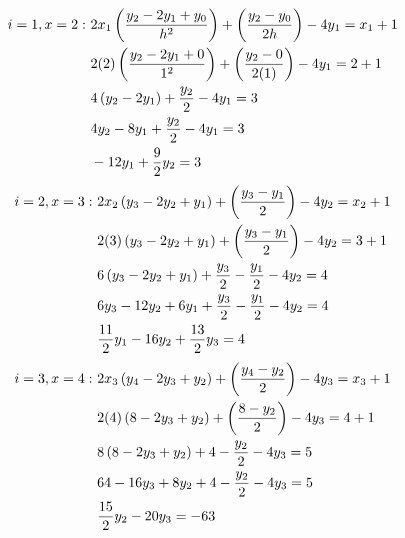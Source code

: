 	\begin{align}
		i=1,x=2: \ &
		2x_{1}
		\left(
			\frac{y_{2} - 2y_{1} + y_{0}}{h^{2}}
		\right)
		+
		\left(
			\frac{y_{2} - y_{0}}{2h}
		\right)
		- 4y_{1} = x_{1} + 1&
		\\ &
		2(2)
		\left(
			\frac{y_{2} - 2y_{1} + 0}{1^{2}}
		\right)
		+
		\left(
			\frac{y_{2} - 0}{2(1)}
		\right)
		- 4y_{1} = 2 + 1&
		\notag \\ &
		4
		\left(
			y_{2} - 2y_{1}
		\right)
		+
		\frac{y_{2}}{2} - 4y_{1} = 3&
		\notag \\ &
		4y_{2} - 8y_{1} + \frac{y_{2}}{2} - 4y_{1} = 3&
		\notag \\ &
		-12y_{1} + \frac{9}{2}y_{2} = 3&
		\\
	\end{align}
	\begin{align}
		i=2,x=3: \ &
		2x_{2}
		\left(
			y_{3} - 2y_{2} + y_{1}
		\right)
		+
		\left(
			\frac{y_{3} - y_{1}}{2}
		\right)
		- 4y_{2} = x_{2} + 1&
		\\ &
		2(3)
		\left(
			y_{3} - 2y_{2} + y_{1}
		\right)
		+
		\left(
			\frac{y_{3} - y_{1}}{2}
		\right)
		- 4y_{2} = 3 + 1&
		\notag \\ &
		6
		\left(
			y_{3} - 2y_{2} + y_{1}
		\right)
		+
		\frac{y_{3}}{2} - \frac{y_{1}}{2} - 4y_{2} = 4&
		\notag \\ &
		6y_{3} - 12y_{2} + 6y_{1} + \frac{y_{3}}{2} - \frac{y_{1}}{2} - 4y_{2} = 4&
		\notag \\ &
		\frac{11}{2}y_{1} - 16y_{2} + \frac{13}{2}y_{3} = 4&
		\\
	\end{align}
	\begin{align}
		i=3,x=4: \ &
		2x_{3}
		\left(
			y_{4} - 2y_{3} + y_{2}
		\right)
		+
		\left(
			\frac{y_{4} - y_{2}}{2}
		\right)
		- 4y_{3} = x_{3} + 1&
		\\ &
		2(4)
		\left(
			8 - 2y_{3} + y_{2}
		\right)
		+
		\left(
			\frac{8 - y_{2}}{2}
		\right)
		- 4y_{3} = 4 + 1&
		\notag \\ &
		8
		\left(
			8 - 2y_{3} + y_{2}
		\right)
		+
		4 - \frac{y_{2}}{2} - 4y_{3} = 5&
		\notag \\ &
		64 - 16y_{3} + 8y_{2} + 4 - \frac{y_{2}}{2} - 4y_{3} = 5&
		\notag \\ &
		\frac{15}{2}y_{2} - 20y_{3} = -63&
	\end{align}

